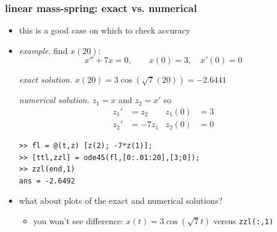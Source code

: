 \documentclass[urlcolor=blue,dvipsnames]{beamer}
\begin{document}
\begin{frame}[fragile]
\frametitle{linear mass-spring: exact vs. numerical}

\begin{itemize}
\item this is a good case on which to check accuracy
\item \emph{example}.  find $x(20)$:
    $$x''+ 7 x = 0, \qquad x(0)=3, \quad x'(0)=0$$

\medskip
\noindent \emph{exact solution.}  $x(20)=3 \cos(\sqrt{7}(20)) = -2.6441$

\bigskip
\noindent \emph{numerical solution.}  $z_1=x$ and $z_2=x'$ so
\begin{align*}
z_1' &= z_2 & z_1(0)&=3 \\
z_2' &= - 7 z_1 & z_2(0)&=0
\end{align*}

\begin{Verbatim}[fontsize=\footnotesize]
>> fl = @(t,z) [z(2); -7*z(1)];
>> [ttl,zzl] = ode45(fl,[0:.01:20],[3;0]);
>> zzl(end,1)
ans = -2.6492
\end{Verbatim}

\item what about plots of the exact and numerical solutions?
    \begin{itemize}
    \item you won't see difference: $x(t)=3 \cos(\sqrt{7} t)$ versus \texttt{zzl(:,1)}
    \end{itemize}
\end{itemize}
\end{frame}
\end{document}
